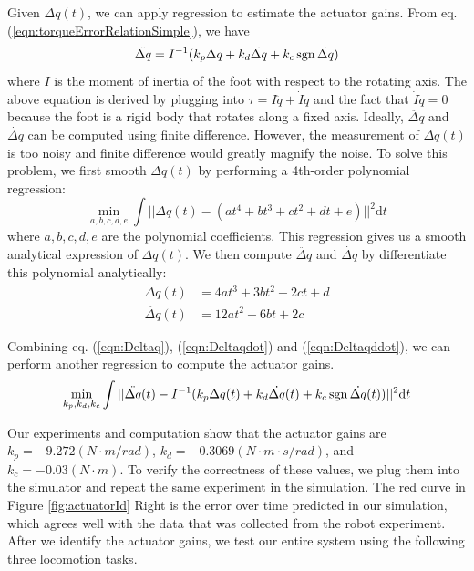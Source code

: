 Given $\Delta q(t)$, we can apply regression to estimate the actuator gains. From eq. (\ref{eqn:torqueErrorRelationSimple}), we have
\begin{equation}
\ddot{\Delta q}=I^{-1}(k_p\Delta q + k_d\dot{\Delta q} + k_c\operatorname{sgn}{\dot{\Delta q}})
\end{equation}
where $I$ is the moment of inertia of the foot with respect to the rotating axis. The above equation is derived by plugging into $\tau = I\ddot{q}+\dot{I}\dot{q}$ and the fact that $\dot{I}\dot{q}=0$ because the foot is a rigid body that rotates along a fixed axis. Ideally, $\ddot{\Delta q}$ and $\dot{\Delta q}$ can be computed using finite difference. However, the measurement of $\Delta q(t)$ is too noisy and finite difference would greatly magnify the noise. To solve this problem, we first smooth $\Delta q(t)$ by performing a 4th-order polynomial regression:
\begin{equation}
  \min_{a,b,c,d,e}\int ||\Delta q(t)-(at^4+bt^3+ct^2+dt+e)||^2\mathrm{d}t
  \label{eqn:Deltaq}
\end{equation}
where $a,b,c,d,e$ are the polynomial coefficients. This regression gives us a smooth analytical expression of $\Delta q(t)$. We then compute $\ddot{\Delta q}$ and $\dot{\Delta q}$ by differentiate this polynomial analytically:
\begin{align}
\label{eqn:Deltaqdot}  \dot{\Delta q}(t)&=4at^3+3bt^2+2ct+d\\
\label{eqn:Deltaqddot}  \ddot{\Delta q}(t)&=12at^2+6bt+2c
\end{align}

Combining eq. (\ref{eqn:Deltaq}), (\ref{eqn:Deltaqdot}) and (\ref{eqn:Deltaqddot}), we can perform another regression to compute the actuator gains.
\begin{equation}
\min_{k_p, k_d, k_c}\int||\ddot{\Delta q}(t)-I^{-1}(k_p\Delta q(t) + k_d\dot{\Delta q}(t) + k_c\operatorname{sgn}{\dot{\Delta q}(t)})||^2\mathrm{d}t
\end{equation}

Our experiments and computation show that the actuator gains are $k_p=-9.272(N\cdot m/rad)$, $k_d=-0.3069(N\cdot m\cdot s/rad)$, and $k_c=-0.03(N\cdot m)$. To verify the correctness of these values, we plug them into the simulator and repeat the same experiment in the simulation. The red curve in Figure \ref{fig:actuatorId} Right is the error over time predicted in our simulation, which agrees well with the data that was collected from the robot experiment. After we identify the actuator gains, we test our entire system using the following three locomotion tasks.

